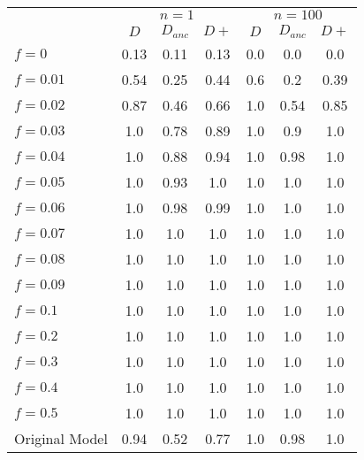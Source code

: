 \begin{tabular}{@{}lcccccc@{}}
\toprule
 & \multicolumn{3}{c}{$n=1$} & \multicolumn{3}{c}{$n=100$} \\
\cmidrule(lr){2-4} \cmidrule(lr){5-7}
 & $D$ & $D_{anc}$ & $D+$ & $D$ & $D_{anc}$ & $D+$ \\
\midrule
$f = 0$ & 0.13 & 0.11 & 0.13 & 0.0 & 0.0 & 0.0 \\
$f = 0.01$ & 0.54 & 0.25 & 0.44 & 0.6 & 0.2 & 0.39 \\
$f = 0.02$ & 0.87 & 0.46 & 0.66 & 1.0 & 0.54 & 0.85 \\
$f = 0.03$ & 1.0 & 0.78 & 0.89 & 1.0 & 0.9 & 1.0 \\
$f = 0.04$ & 1.0 & 0.88 & 0.94 & 1.0 & 0.98 & 1.0 \\
$f = 0.05$ & 1.0 & 0.93 & 1.0 & 1.0 & 1.0 & 1.0 \\
$f = 0.06$ & 1.0 & 0.98 & 0.99 & 1.0 & 1.0 & 1.0 \\
$f = 0.07$ & 1.0 & 1.0 & 1.0 & 1.0 & 1.0 & 1.0 \\
$f = 0.08$ & 1.0 & 1.0 & 1.0 & 1.0 & 1.0 & 1.0 \\
$f = 0.09$ & 1.0 & 1.0 & 1.0 & 1.0 & 1.0 & 1.0 \\
$f = 0.1$ & 1.0 & 1.0 & 1.0 & 1.0 & 1.0 & 1.0 \\
$f = 0.2$ & 1.0 & 1.0 & 1.0 & 1.0 & 1.0 & 1.0 \\
$f = 0.3$ & 1.0 & 1.0 & 1.0 & 1.0 & 1.0 & 1.0 \\
$f = 0.4$ & 1.0 & 1.0 & 1.0 & 1.0 & 1.0 & 1.0 \\
$f = 0.5$ & 1.0 & 1.0 & 1.0 & 1.0 & 1.0 & 1.0 \\
Original Model & 0.94 & 0.52 & 0.77 & 1.0 & 0.98 & 1.0 \\
\bottomrule
\end{tabular}
